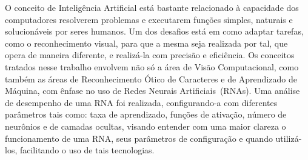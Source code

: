 \documentclass[12pt,oneside,a4paper,chapter=TITLE,section=TITLE,sumario
		=tradicional]{abntex2}
\begin{document}
		
			\hypersetup{%
				colorlinks = true,
				linkcolor  = black,
				allcolors  = black
			}
			
			
			\let\subsectionautorefname\sectionautorefname
			\let\subsubsectionautorefname\sectionautorefname
		
		
		\imprimircapa
		\imprimirfolhaderosto
		

		\begin{resumo}
			
			O conceito de Inteligência Artificial está bastante relacionado à capacidade dos computadores resolverem problemas e executarem funções simples, naturais e solucionáveis por seres humanos. Um dos desafios está em como adaptar tarefas, como o reconhecimento visual, para que a mesma seja realizada por tal, que opera de maneira diferente, e realizá-la com precisão e eficiência. Os conceitos tratados nesse trabalho envolvem não só a área de Visão Computacional, como também as áreas de Reconhecimento Ótico de Caracteres e de Aprendizado de Máquina, com ênfase no uso de Redes Neurais Artificiais~(RNAs). Uma análise de desempenho de uma RNA foi realizada, configurando-a com diferentes parâmetros tais como: taxa de aprendizado, funções de ativação, número de neurônios e de camadas ocultas, visando entender com uma maior clareza o funcionamento de uma RNA, seus parâmetros de configuração e quando utilizá-los, facilitando o uso de tais tecnologias.
					    
		\end{resumo}
		
\end{document}
